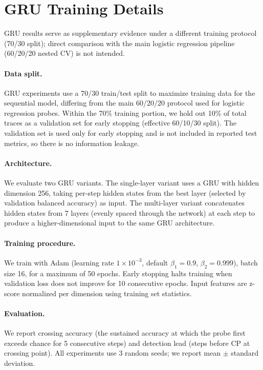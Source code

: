 \section{GRU Training Details}
\label{app:gru_details}

GRU results serve as supplementary evidence under a different training protocol (70/30 split); direct comparison with the main logistic regression pipeline (60/20/20 nested CV) is not intended.

\paragraph{Data split.} GRU experiments use a 70/30 train/test split to maximize training data for the sequential model, differing from the main 60/20/20 protocol used for logistic regression probes. Within the 70\% training portion, we hold out 10\% of total traces as a validation set for early stopping (effective 60/10/30 split). The validation set is used only for early stopping and is not included in reported test metrics, so there is no information leakage.

\paragraph{Architecture.} We evaluate two GRU variants. The single-layer variant uses a GRU with hidden dimension 256, taking per-step hidden states from the best layer (selected by validation balanced accuracy) as input. The multi-layer variant concatenates hidden states from 7 layers (evenly spaced through the network) at each step to produce a higher-dimensional input to the same GRU architecture.

\paragraph{Training procedure.} We train with Adam (learning rate $1 \times 10^{-3}$, default $\beta_1{=}0.9$, $\beta_2{=}0.999$), batch size 16, for a maximum of 50 epochs. Early stopping halts training when validation loss does not improve for 10 consecutive epochs. Input features are z-score normalized per dimension using training set statistics.

\paragraph{Evaluation.} We report crossing accuracy (the sustained accuracy at which the probe first exceeds chance for 5 consecutive steps) and detection lead (steps before CP at crossing point). All experiments use 3 random seeds; we report mean $\pm$ standard deviation.

